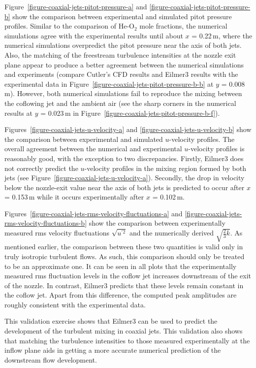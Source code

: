 Figure~\ref{figure-coaxial-jets-pitot-pressure-a} and 
\ref{figure-coaxial-jets-pitot-pressure-b} show the comparison
between experimental and simulated pitot pressure profiles. Similar to
the comparison of He-O$_2$ mole fractions, the numerical simulations
agree with the experimental results until about $x$ = 0.22\,m, where the
numerical simulations overpredict the pitot pressure near the axis of
both jets. Also, the matching of the freestream turbulence intensities
at the nozzle exit plane appear to produce a better agreement 
between the numerical simulations and experiments (compare Cutler's CFD
results and Eilmer3 results with the experimental data in Figure~\ref{figure-coaxial-jets-pitot-pressure-b-b}
at $y$ = 0.008\,m). However, both numerical simulations fail to reproduce
the mixing between the coflowing jet and the ambient air (see the sharp
corners in the numerical results at $y$ = 0.023\,m in Figure~\ref{figure-coaxial-jets-pitot-pressure-b-f}).

Figures~\ref{figure-coaxial-jets-u-velocity-a} and 
\ref{figure-coaxial-jets-u-velocity-b} show the comparison
between experimental and simulated  $u$-velocity profiles.
The overall agreement between the numerical and experimental $u$-velocity profiles
is reasonably good, with the exception to two discrepancies. Firstly, 
Eilmer3 does not correctly predict the $u$-velocity profiles in the mixing 
region formed by both jets (see Figure~\ref{figure-coaxial-jets-u-velocity-a}). 
Secondly, the drop in velocity below the nozzle-exit value near the axis 
of both jets is predicted to occur after $x$ = 0.153\,m while it occurs 
experimentally after $x$ = 0.102\,m. 

Figures~\ref{figure-coaxial-jets-rms-velocity-fluctuations-a} and
\ref{figure-coaxial-jets-rms-velocity-fluctuations-b} show the comparison
between experimentally measured rms velocity fluctuations $\sqrt{u^{'2}}$ 
and the numerically derived $\sqrt{\frac{2}{3}k}$. As mentioned earlier, the
comparison between these two quantities is valid only in truly isotropic
turbulent flows. As such, this comparison should only be treated to be
an approximate one. It can be seen in all plots that the experimentally measured
rms fluctuation levels in the coflow jet increases downstream of the exit of the 
nozzle. In contrast, Eilmer3 predicts that these levels remain constant in the 
coflow jet. Apart from this difference, the computed peak amplitudes are roughly 
consistent with the experimental data.

This validation exercise shows that Eilmer3 can be used to predict the development 
of the turbulent mixing in coaxial jets. This validation also shows that matching
the turbulence intensities to those measured experimentally at the inflow plane
aids in getting a more accurate numerical prediction of the downstream flow
development.


